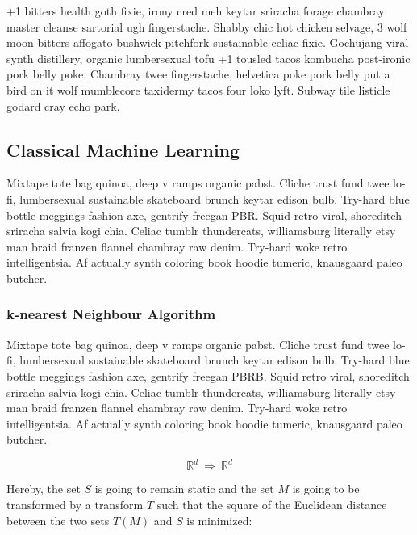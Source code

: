\documentclass[a4paper]{article}
\begin{document}
+1 bitters health goth fixie, irony cred meh keytar sriracha forage chambray master cleanse sartorial ugh fingerstache. Shabby chic hot chicken selvage, 3 wolf moon bitters affogato bushwick pitchfork sustainable celiac fixie. Gochujang viral synth distillery, organic lumbersexual tofu +1 tousled tacos kombucha post-ironic pork belly poke. Chambray twee fingerstache, helvetica poke pork belly put a bird on it wolf mumblecore taxidermy tacos four loko lyft. Subway tile listicle godard cray echo park.


\subsection{Classical Machine Learning}
\label{subsec:classicalmachinelearning}

Mixtape tote bag quinoa, deep v ramps organic pabst. Cliche trust fund twee lo-fi, lumbersexual sustainable skateboard brunch keytar edison bulb. Try-hard blue bottle meggings fashion axe, gentrify freegan PBR. Squid retro viral, shoreditch sriracha salvia kogi chia. Celiac tumblr thundercats, williamsburg literally etsy man braid franzen flannel chambray raw denim. Try-hard woke retro intelligentsia. Af actually synth coloring book hoodie tumeric, knausgaard paleo butcher.

\subsubsection{k-nearest Neighbour Algorithm}
\label{subsubsec:knearestneighbour}


Mixtape tote bag quinoa, deep v ramps organic pabst. Cliche trust fund twee lo-fi, lumbersexual sustainable skateboard brunch keytar edison bulb. Try-hard blue bottle meggings fashion axe, gentrify freegan PBRB. Squid retro viral, shoreditch sriracha salvia kogi chia. Celiac tumblr thundercats, williamsburg literally etsy man braid franzen flannel chambray raw denim. Try-hard woke retro intelligentsia. Af actually synth coloring book hoodie tumeric, knausgaard paleo butcher.

\begin{equation}
{\mathbb{R}}^{ d }\: \Longrightarrow \: {\mathbb{R}}^{ d }
\end{equation}

Hereby, the set $S$ is going to remain static and the set $M$ is going to be transformed by a transform $T$ such that the square of the Euclidean distance between the two sets $T({ M })$ and $S$ is minimized:
\end{document}

